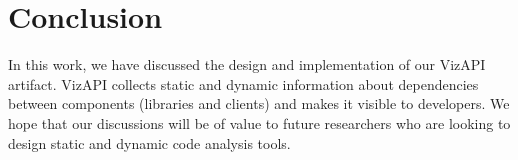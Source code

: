 \section{Conclusion}
In this work, we have discussed the design and implementation of our
VizAPI artifact. VizAPI collects static and dynamic information
about dependencies between components (libraries and clients) and makes
it visible to developers. We hope that our discussions will be of value
to future researchers who are looking to design static and dynamic
code analysis tools.

